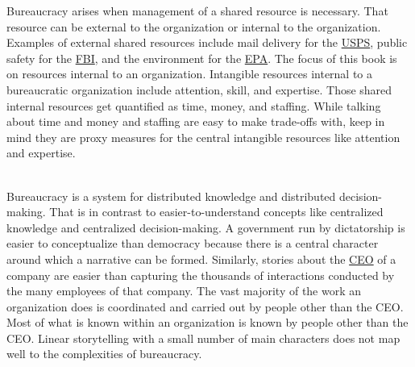 Bureaucracy arises when management of a shared resource is necessary.
That resource can be external to the organization or internal to the organization. Examples of external shared resources include mail delivery for the \href{https://en.wikipedia.org/wiki/United_States_Postal_Service}{USPS}, 
\iftoggle{WPinmargin}{\marginpar{[Wikipedia] USPS}}{}
public safety for the \href{https://en.wikipedia.org/wiki/Federal_Bureau_of_Investigation}{FBI}, 
and the environment for the \href{https://en.wikipedia.org/wiki/United_States_Environmental_Protection_Agency}{EPA}. 
The focus of this book is on resources internal to an organization. Intangible resources internal to a bureaucratic organization include attention, skill, and expertise. Those shared internal resources get quantified as time, money, and staffing. While talking about time and money and staffing are easy to make trade-offs with, keep in mind they are proxy measures for the central intangible resources like attention and expertise.

\ \\

Bureaucracy is a system for distributed knowledge and distributed decision-making. 
That is in contrast to easier-to-understand concepts like centralized knowledge and centralized decision-making. A government run by dictatorship is easier to conceptualize than democracy because there is a central character around which a narrative can be formed. Similarly, stories about the \href{https://en.wikipedia.org/wiki/Chief_executive_officer}{CEO} 
\iftoggle{WPinmargin}{\marginpar{[Wikipedia] Chief\\executive officer}}{}
of a company are easier than capturing the thousands of interactions conducted by the many employees of that company. The vast majority of the work an organization does is coordinated and carried out by people other than the CEO. Most of what is known within an organization is known by people other than the CEO. Linear storytelling with a small number of main characters does not map well to the complexities of bureaucracy. 


